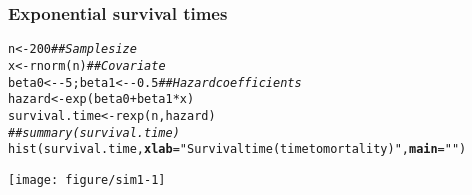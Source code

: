 \documentclass[color=usenames,dvipsnames]{beamer}\usepackage[]{graphicx}\usepackage[]{color}
\makeatletter
\newcommand{\hlnum}[1]{\textcolor[rgb]{0.69,0.494,0}{#1}}%
\newcommand{\hlstr}[1]{\textcolor[rgb]{0.749,0.012,0.012}{#1}}%
\newcommand{\hlcom}[1]{\textcolor[rgb]{0.514,0.506,0.514}{\textit{#1}}}%
\newcommand{\hlopt}[1]{\textcolor[rgb]{0,0,0}{#1}}%
\newcommand{\hlstd}[1]{\textcolor[rgb]{0,0,0}{#1}}%
\newcommand{\hlkwb}[1]{\textcolor[rgb]{0,0.341,0.682}{#1}}%
\newcommand{\hlkwc}[1]{\textcolor[rgb]{0,0,0}{\textbf{#1}}}%
\newcommand{\hlkwd}[1]{\textcolor[rgb]{0.004,0.004,0.506}{#1}}%
\newenvironment{kframe}{%
 \def\at@end@of@kframe{}%
 \ifinner\ifhmode%
  \def\at@end@of@kframe{\end{minipage}}%
  \begin{minipage}{\columnwidth}%
 \fi\fi%
 \def\FrameCommand##1{\hskip\@totalleftmargin \hskip-\fboxsep
 \colorbox{shadecolor}{##1}\hskip-\fboxsep
     \hskip-\linewidth \hskip-\@totalleftmargin \hskip\columnwidth}%
 \MakeFramed {\advance\hsize-\width
   \@totalleftmargin\z@ \linewidth\hsize
   \@setminipage}}%
 {\par\unskip\endMakeFramed%
 \at@end@of@kframe}
\newenvironment{knitrout}{}{} %
\makeatother
\begin{document}
\begin{frame}[fragile]
  \frametitle{Exponential survival times}
\begin{knitrout}\scriptsize
{}\color{fgcolor}\begin{kframe}
\begin{alltt}
\hlstd{n} \hlkwb{<-} \hlnum{200}                          \hlcom{## Sample size}
\hlstd{x} \hlkwb{<-} \hlkwd{rnorm}\hlstd{(n)}                     \hlcom{## Covariate}
\hlstd{beta0} \hlkwb{<-} \hlopt{-}\hlnum{5}\hlstd{; beta1} \hlkwb{<-} \hlopt{-}\hlnum{0.5}        \hlcom{## Hazard coefficients}
\hlstd{hazard} \hlkwb{<-} \hlkwd{exp}\hlstd{(beta0} \hlopt{+} \hlstd{beta1}\hlopt{*}\hlstd{x)}
\hlstd{survival.time} \hlkwb{<-} \hlkwd{rexp}\hlstd{(n, hazard)}
\hlcom{## summary(survival.time)}
\hlkwd{hist}\hlstd{(survival.time,} \hlkwc{xlab}\hlstd{=}\hlstr{"Survival time (time to mortality)"}\hlstd{,} \hlkwc{main}\hlstd{=}\hlstr{""}\hlstd{)}
\end{alltt}
\end{kframe}

{\centering \texttt{[image: figure/sim1-1]} 

}


\end{knitrout}
\end{frame}



\end{document}
